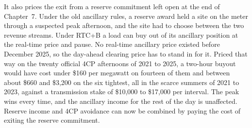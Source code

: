 It also prices the exit from a reserve commitment left open at the end of Chapter~7. Under the old ancillary rules, a reserve award held a site on the meter through a suspected peak afternoon, and the site had to choose between the two revenue streams. Under RTC+B a load can buy out of its ancillary position at the real-time price and pause. No real-time ancillary price existed before December 2025, so the day-ahead clearing price has to stand in for it. Priced that way on the twenty official 4CP afternoons of 2021 to 2025, a two-hour buyout would have cost under \$160 per megawatt on fourteen of them and between about \$660 and \$3,200 on the six tightest, all in the scarce summers of 2021 to 2023, against a transmission stake of \$10,000 to \$17,000 per interval. The peak wins every time, and the ancillary income for the rest of the day is unaffected. %
Reserve income and 4CP avoidance can now be combined by paying the cost of exiting the reserve commitment.

